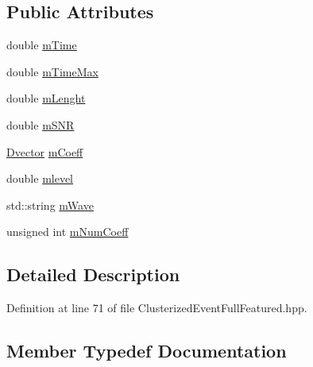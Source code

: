 \subsection*{Public Attributes}
\begin{DoxyCompactItemize}
\item 
double \hyperlink{classtsa_1_1_clusterized_event_full_featured_a0dc1898eef01fd58ccfa9270ad24e96a}{m\+Time}
\item 
double \hyperlink{classtsa_1_1_clusterized_event_full_featured_ab4a9b08a4019a112d8ed0ee90c632086}{m\+Time\+Max}
\item 
double \hyperlink{classtsa_1_1_clusterized_event_full_featured_a0fa06a03d489ea7f6ebfce8206ec9b6e}{m\+Lenght}
\item 
double \hyperlink{classtsa_1_1_clusterized_event_full_featured_a0702a9ea63e99af5f8ec4ff9ce50b30b}{m\+S\+NR}
\item 
\hyperlink{classtsa_1_1_clusterized_event_full_featured_a3b6ced7b46c6d82cd122cc6c2b5c2178}{Dvector} \hyperlink{classtsa_1_1_clusterized_event_full_featured_a3361bc03902ba355a8f5cd387f57224d}{m\+Coeff}
\item 
double \hyperlink{classtsa_1_1_clusterized_event_full_featured_ae032a372be8aedc0da70062d704d08e8}{mlevel}
\item 
std\+::string \hyperlink{classtsa_1_1_clusterized_event_full_featured_adfc4ed6458ae50142c291531aa2dd3ed}{m\+Wave}
\item 
unsigned int \hyperlink{classtsa_1_1_clusterized_event_full_featured_ac4cb0cdaa14a636f67055aa93be5f84f}{m\+Num\+Coeff}
\end{DoxyCompactItemize}


\subsection{Detailed Description}


Definition at line 71 of file Clusterized\+Event\+Full\+Featured.\+hpp.



\subsection{Member Typedef Documentation}
\mbox{\label{classtsa_1_1_clusterized_event_full_featured_a3b6ced7b46c6d82cd122cc6c2b5c2178}} 
